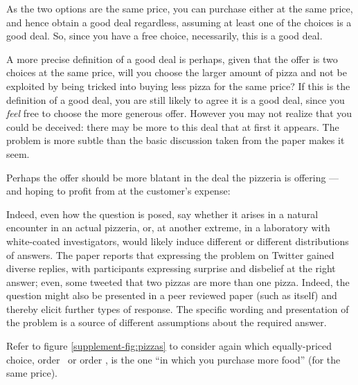 \documentclass[11pt]{article}
\begin{document}
As the two options are the same price, you can purchase either at the same price, and hence obtain a good deal regardless, assuming at least one of the choices is a good deal. So, since you have a free choice, necessarily, this is a good deal.

A more precise definition of a good deal is perhaps, given that the offer is two choices at the same price, will you choose the larger amount of pizza and not be exploited by being tricked into buying less pizza for the same price? If this is the definition of a good deal, you are still likely to agree it is a good deal, since you \emph{feel\/} free to choose the more generous offer. However you may not realize that you could be deceived: there may be more to this deal that at first it appears. The problem is more subtle than the basic discussion taken from the paper makes it seem. 

Perhaps the offer should be more blatant in the deal the pizzeria is offering --- and hoping to profit from at the customer's expense:

\begin{quote}\begin{center}\sf{}
\end{center}\end{quote}

Indeed, even how the question is posed, say whether it arises in a natural encounter in an actual pizzeria, or, at another extreme, in a laboratory with white-coated investigators, would likely induce different or different distributions of answers. The paper \cite{pizzap} reports that expressing the problem on Twitter gained diverse replies, with participants expressing surprise and disbelief at the right answer; even, some tweeted that two pizzas are more than one pizza. Indeed, the question might also be presented in a peer reviewed paper (such as \cite{pizzap} itself) and thereby elicit further types of response. The specific wording and presentation of the problem is a source of different assumptions about the required answer. 

Refer to figure \ref{supplement-fig:pizzas} to consider again which equally-priced choice, order \orderA\ or order \orderB, is the one ``in which you purchase  more food'' (for the same price). 
\end{document}
